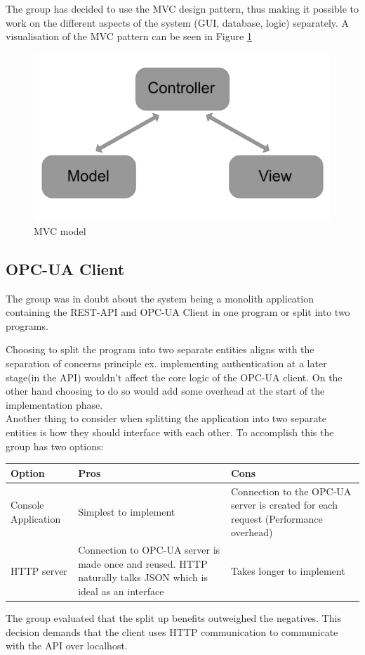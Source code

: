 The group has decided to use the MVC design pattern, thus making it possible to
work on the different aspects of the system (GUI, database, logic) separately. 
A visualisation of the MVC pattern can be seen in Figure \ref{figure:MVC_model}

\begin{figure}[H]
    \centering
    \includegraphics[scale=0.15]{images/MVC_model.png}
    \caption{MVC model}
    \label{figure:MVC_model}
\end{figure}

\subsection{OPC-UA Client}
The group was in doubt about the system being a monolith application containing 
the REST-API and OPC-UA Client in one program or split into two programs.

Choosing to split the program into two separate entities aligns with the 
separation of concerns principle ex. implementing authentication at a later 
stage(in the API) wouldn't affect the core logic of the OPC-UA client. On the 
other hand choosing to do so would add some overhead at the start of the 
implementation phase. \\

Another thing to consider when splitting the application into two separate 
entities is how they should interface with each other. To accomplish this the 
group has two options: 

\begin{table}[ht]
    \begin{tabularx}{\textwidth}{|>{\RaggedRight}X|>{\RaggedRight}X|>{\RaggedRight}X|}
        \hline
        \textbf{Option} & \textbf{Pros} & \textbf{Cons} \\
        \hline
        Console Application & Simplest to implement & Connection to the OPC-UA 
        server is created for each request (Performance overhead)\\
        \hline
        HTTP server & Connection to OPC-UA server is made once and reused. HTTP
        naturally talks JSON which is ideal as an interface & Takes longer to 
        implement \\
        \hline
    \end{tabularx}
    \label{someLabel}
\end{table}

The group evaluated that the split up benefits outweighed the negatives. This 
decision demands that the client uses HTTP communication to communicate with the
API over localhost. 
